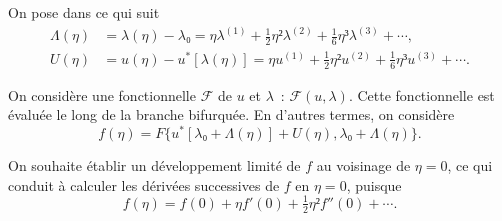 \documentclass[12pt, final]{scrartcl}
\theoremstyle{definition}
\newcommand{\order}[2][1]{#2^{(#1)}}
\begin{document}
On pose dans ce qui suit
\begin{align}
  \label{eq:20211112155446}
  Λ(η) & = λ(η) - λ₀ = η \order[1]λ + \tfrac{1}{2} η² \order[2]λ + \tfrac{1}{6} η³ \order[3]λ + \cdots,\\
  \label{eq:20211112113028}
  U(η) & = u(η) - u^{\ast}[λ(η)] = η \order[1]u + \tfrac{1}{2} η² \order[2]u + \tfrac{1}{6} η³ \order[3]u + \cdots.
\end{align}

On considère une fonctionnelle \(\mathcal{F}\) de \(u\) et \(λ\)~:
\(\mathcal{F}(u, λ)\). Cette fonctionnelle est évaluée le long de la branche
bifurquée. En d'autres termes, on considère
\begin{equation*}
  f(η) = F\{ u^{\ast} [λ₀ + Λ(η)] + U(η), λ₀ + Λ(η) \}.
\end{equation*}

On souhaite établir un développement limité de \(f\) au voisinage de \(η = 0\),
ce qui conduit à calculer les dérivées successives de \(f\) en \(η = 0\),
puisque
\begin{equation*}
  f(η) = f(0) + η f'(0) + \tfrac{1}{2} η² f''(0) + \cdots.
\end{equation*}
\end{document}
